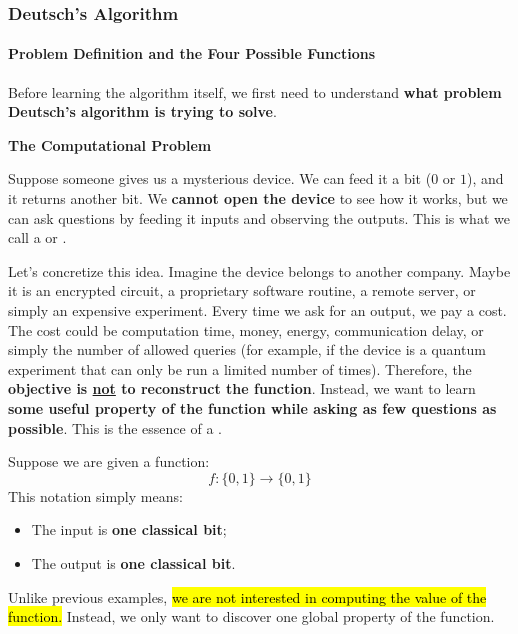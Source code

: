 \subsubsection{Deutsch's Algorithm}\label{ex:deutschs-algorithm}

\paragraph{Problem Definition and the Four Possible Functions}\label{ex:problem-definition-and-the-four-possible-functions}

Before learning the algorithm itself, we first need to understand \textbf{what problem Deutsch's algorithm is trying to solve}.

\highspace
\begin{flushleft}
    \textcolor{Red2}{ \textbf{The Computational Problem}}
\end{flushleft}
Suppose someone gives us a mysterious device. We can feed it a bit ($0$ or $1$), and it returns another bit. We \textbf{cannot open the device} to see how it works, but we can ask questions by feeding it inputs and observing the outputs. This is what we call a  or .

\highspace
Let's concretize this idea. Imagine the device belongs to another company. Maybe it is an encrypted circuit, a proprietary software routine, a remote server, or simply an expensive experiment. Every time we ask for an output, we pay a cost. The cost could be computation time, money, energy, communication delay, or simply the number of allowed queries (for example, if the device is a quantum experiment that can only be run a limited number of times). Therefore, the \textbf{objective is \underline{not} to reconstruct the function}. Instead, we want to learn \textbf{some useful property of the function while asking as few questions as possible}. This is the essence of a .

\highspace
Suppose we are given a function:
\begin{equation*}
    f : \{0, 1\} \to \{0, 1\}
\end{equation*}
This notation simply means:
\begin{itemize}
    \item The input is \textbf{one classical bit};
    \item The output is \textbf{one classical bit}.
\end{itemize}
Unlike previous examples, \hl{we are not interested in computing the value of the function.} Instead, we only want to discover one global property of the function.

